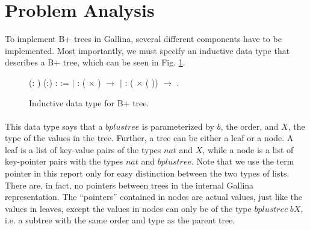 \section{Problem Analysis}
\label{sec:ProblemAnalysis}
To implement B+ trees in Gallina, several different components have to be implemented. Most importantly, we must specify an inductive data type that describes a B+ tree, which can be seen in Fig. \ref{fig:inductive_data_type}.

\begin{figure}
\centering
\begin{coqdoccode}
  (: ) (:) :  :=\coqdoceol
\coqdocindent{1.00em}
\ensuremath{|}  :  ( \ensuremath{\times} ) \ensuremath{\rightarrow}   \coqdoceol
\coqdocindent{1.00em}
\ensuremath{|}  :  ( \ensuremath{\times} (  )) \ensuremath{\rightarrow}   .\coqdoceol
\end{coqdoccode}
\caption{Inductive data type for B+ tree.}
\label{fig:inductive_data_type}
\end{figure}

\paragraph{}
This data type says that a $bplustree$ is parameterized by $b$, the order, and $X$, the type of the values in the tree. Further, a tree can be either a leaf or a node. A leaf is a list of key-value pairs of the types $nat$ and $X$, while a node is a list of key-pointer pairs with the types $nat$ and $bplustree$. Note that we use the term pointer in this report only for easy distinction between the two types of lists. There are, in fact, no pointers between trees in the internal Gallina representation. The ``pointers'' contained in nodes are actual values, just like the values in leaves, except the values in nodes can only be of the type $bplustree~bX$, i.e. a subtree with the same order and type as the parent tree.

